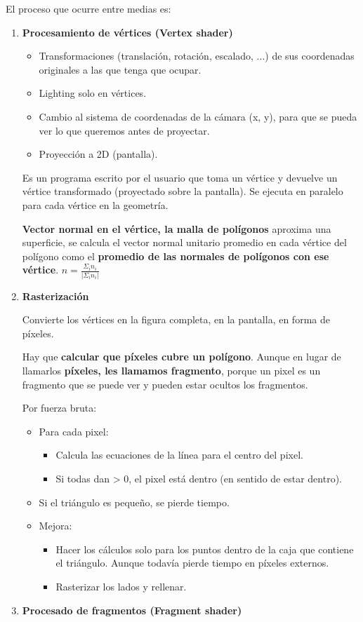 El proceso que ocurre entre medias es:
\begin{enumerate}
	\item \textbf{Procesamiento de vértices (Vertex shader)}
	      \begin{itemize}
		      \item Transformaciones (translación, rotación, escalado, ...) de sus coordenadas originales a las que tenga que ocupar.
		      \item Lighting solo en vértices.
		      \item Cambio al sistema de coordenadas de la cámara (x, y), para que se pueda ver lo que queremos antes de proyectar.
		      \item Proyección a 2D (pantalla).
	      \end{itemize}
	      
	      Es un programa escrito por el usuario que toma un vértice y devuelve un vértice transformado (proyectado sobre la pantalla). Se ejecuta en paralelo para cada vértice en la geometría.
	      
	      \textbf{Vector normal en el vértice, la malla de polígonos} aproxima una superficie, se calcula el vector normal unitario promedio en cada vértice del polígono como el \textbf{promedio de las normales de polígonos con ese vértice}. $n= \frac{\Sigma_i n_i}{|\Sigma_i n_i|}$
	\item \textbf{Rasterización}
	      
	      Convierte los vértices en la figura completa, en la pantalla, en forma de píxeles.
	      
	      Hay que \textbf{calcular que píxeles cubre un polígono}. Aunque en lugar de llamarlos \textbf{píxeles, les llamamos fragmento}, porque un pixel es un fragmento que se puede ver y pueden estar ocultos los fragmentos.
	      
	      Por fuerza bruta:
	      \begin{itemize}
		      \item Para cada pixel:
		            \begin{itemize}
			            \item Calcula las ecuaciones de la línea para el centro del pixel.
			            \item Si todas dan > 0, el pixel está dentro (en sentido de estar dentro).
		            \end{itemize}
		      \item Si el triángulo es pequeño, se pierde tiempo.
		      \item Mejora:
		            \begin{itemize}
			            \item Hacer los cálculos solo para los puntos dentro de la caja que contiene el triángulo. Aunque todavía pierde tiempo en píxeles externos.
			            \item Rasterizar los lados y rellenar.
		            \end{itemize}
	      \end{itemize}
	\item \textbf{Procesado de fragmentos (Fragment shader)}
	      

\end{enumerate}
